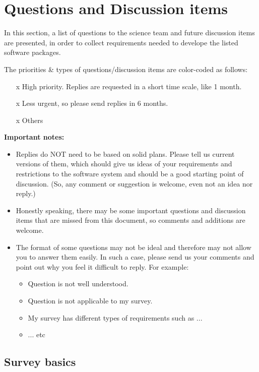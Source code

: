\documentclass[a4paper,notitlepage]{article}
\newcommand{\cols}[1]{\textcolor{ccols}{#1}}
\newcommand{\colm}[1]{\textcolor{ccolm}{#1}}
\newcommand{\coll}[1]{\textcolor{ccoll}{#1}}
\begin{document}
\section{Questions and Discussion items}

In this section, a list of questions to the science team and future
discussion items are presented, in order to collect requirements needed
to develope the listed software packages.

The priorities \& types of questions/discussion items are color-coded as
follows:
\begin{enumerate}
  \item[\colm{x}] High priority. Replies are requested in a short time
           scale, like 1 month.
  \item[\cols{x}] Less urgent, so please send replies in 6 months.
  \item[\coll{x}] Others
\end{enumerate}

{\bf Important notes:}
\begin{itemize}
 \item Replies do NOT need to be based on solid plans. Please tell us
       current versions of them, which should give us ideas of your
       requirements and restrictions to the software system and should
       be a good starting point of discussion.
       (So, any comment or suggestion is welcome, even not an idea nor reply.) 
 \item Honestly speaking, there may be some important questions and
       discussion items that are missed from this document, so comments
       and additions are welcome.
 \item The format of some questions may not be ideal and therefore may
       not allow you to answer them easily. In such a case, please send
       us your comments and point out why you feel it difficult to
       reply. For example:
       \begin{itemize}
    \item Question is not well understood.
    \item Question is not applicable to my survey.
    \item My survey has different types of requirements such as ... 
    \item ... etc
       \end{itemize}
\end{itemize}

\subsection{Survey basics}
\end{document}
